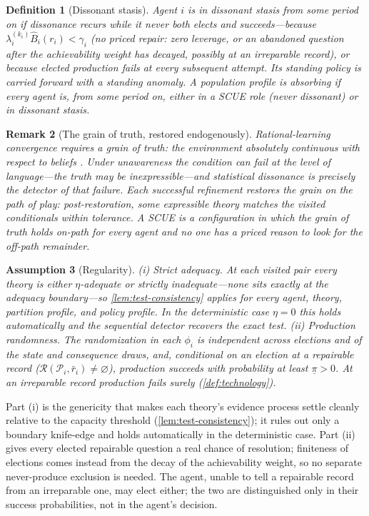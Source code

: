 \documentclass[11pt]{article}
\newtheorem{assumption}{Assumption}[section]
\newtheorem{definition}[assumption]{Definition}
\newtheorem{remark}[assumption]{Remark}
\theoremstyle{definition}
\newcommand{\emptysetset}{\varnothing}
\begin{document}
\begin{definition}[Dissonant stasis]
\label{def:stasis}
Agent $i$ is in \emph{dissonant stasis} from some period on if dissonance recurs while it never both elects and succeeds---because $\lambda_i^{(k_i)}\widehat B_i(r_i)<\gamma_i$ (no priced repair: zero leverage, or an abandoned question after the achievability weight has decayed, possibly at an irreparable record), or because elected production fails at every subsequent attempt.
Its standing policy is carried forward with a standing anomaly.
A population profile is \emph{absorbing} if every agent is, from some period on, either in a SCUE role (never dissonant) or in dissonant stasis.
\end{definition}

\begin{remark}[The grain of truth, restored endogenously]
\label{rem:grain}
Rational-learning convergence requires a grain of truth: the environment absolutely continuous with respect to beliefs \citep{KalaiLehrer1993a}.
Under unawareness the condition can fail at the level of language---the truth may be inexpressible---and statistical dissonance is precisely the detector of that failure.
Each successful refinement restores the grain \emph{on the path of play}: post-restoration, some expressible theory matches the visited conditionals within tolerance.
A SCUE is a configuration in which the grain of truth holds on-path for every agent and no one has a priced reason to look for the off-path remainder.
\end{remark}

\begin{assumption}[Regularity]
\label{ass:regularity}
(i) \emph{Strict adequacy.}
At each visited pair every theory is either $\eta$-adequate or strictly inadequate---none sits exactly at the adequacy boundary---so \cref{lem:test-consistency} applies for every agent, theory, partition profile, and policy profile.
In the deterministic case $\eta=0$ this holds automatically and the sequential detector recovers the exact test.
(ii) \emph{Production randomness.}
The randomization in each $\phi_i$ is independent across elections and of the state and consequence draws, and, conditional on an election at a \emph{repairable} record ($\mathcal R(\mathcal P_i,\bar r_i)\neq\emptysetset$), production succeeds with probability at least $\underline\pi>0$.
At an irreparable record production fails surely (\cref{def:technology}).
\end{assumption}

Part (i) is the genericity that makes each theory's evidence process settle cleanly relative to the capacity threshold (\cref{lem:test-consistency}); it rules out only a boundary knife-edge and holds automatically in the deterministic case.
Part (ii) gives every elected repairable question a real chance of resolution; finiteness of elections comes instead from the decay of the achievability weight, so no separate never-produce exclusion is needed.
The agent, unable to tell a repairable record from an irreparable one, may elect either; the two are distinguished only in their success probabilities, not in the agent's decision.
\end{document}
